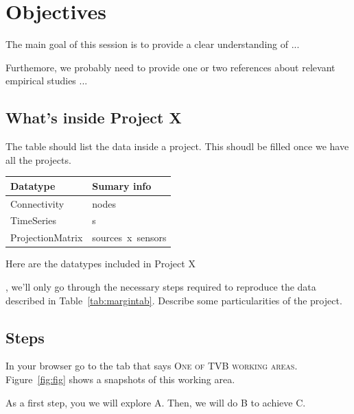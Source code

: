 \documentclass{tufte-handout}
\begin{document}
\section{Objectives}\label{sec:objectives}

The main goal of this session is to provide a clear understanding of ...

Furthemore, we probably need to provide one or two references about relevant
empirical studies ...


\subsection{What's inside Project X }\label{sec:project_data}

The table should list the data inside a project. This shoudl be filled once we
have all the projects.

\begin{margintable}
  \centering
  \selectfont
  \begin{tabular}{ll}
    \toprule
    Datatype & Sumary info                       \\
    \midrule
    Connectivity         & \unit[X]{nodes}                    \\
    TimeSeries           & \unit[200]{s}             \\
    ProjectionMatrix     & \unit[M x N]{sources x sensors} \\
    \bottomrule
  \end{tabular}
  \caption{Here are the datatypes included in Project X}
  \label{tab:margintab}
\end{margintable}



, we'll only go through the necessary steps
required to reproduce the data described in Table~\ref{tab:margintab}.
Describe some particularities of the project. 


\subsection{Steps}\label{sec:steps}

In your browser go to the tab that says \textsc{One of TVB working areas}.
Figure~\ref{fig:fig} shows a snapshots of this working area. 

As a first step, you we will explore {\color{RoyalBlue}\textsc{A}}. Then, we
will do {\color{RoyalBlue} \textsc{B}} to achieve
{\color{RoyalBlue} \textsc{C}}.
\end{document}
